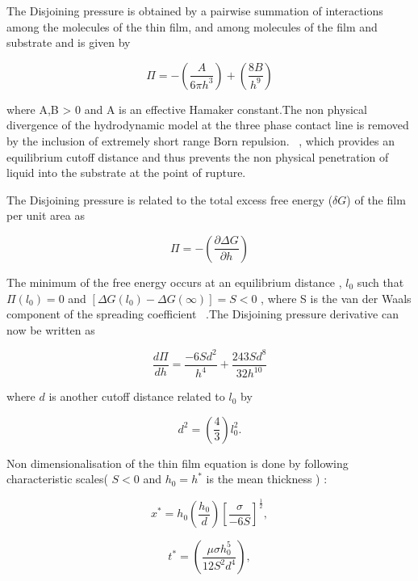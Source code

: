 \documentclass[
manuscript=article]{achemso}
\begin{document}
The Disjoining pressure is obtained by a pairwise summation of interactions among the molecules of the thin film, and among molecules of the  film and substrate and is given by

\begin{equation}
\Pi = - \left(\frac{A}{6 \pi h^{3}} \right) + \left( \frac{8B}{h^{9}} \right)
\end{equation}

where A,B > 0 and A is an effective Hamaker constant.The non physical divergence of the hydrodynamic model at the three phase contact line is removed by the inclusion of extremely short range Born repulsion.~\cite{10} , which provides an equilibrium cutoff distance and thus prevents the non physical penetration of liquid into the substrate at the point of rupture.

The Disjoining pressure is related to the total excess free energy ($ \delta G  $) of the film per unit area as

\begin{equation}
\Pi = -\left(\frac{\partial{\Delta G}}{\partial{h}} \right)
\end{equation}

The minimum of the free energy occurs at an equilibrium distance , $ l_{0} $ such that $ \Pi(l_{0}) = 0 $
and $ \left[\Delta G\left(l_{0}\right) - \Delta G\left(\infty\right) \right] = S < 0 $ , where S is the van der Waals component of the spreading coefficient ~\cite{11}.The Disjoining pressure derivative can now be written as ~\cite{12}

\begin{equation}
\frac{d\Pi}{dh} = \frac{-6Sd^{2}}{h^{4}} + \frac{243Sd^{8}}{32h^{10}}
\end{equation}  

where $d$ is another cutoff distance related to $ l_{0} $ by 

\begin{equation}
d^{2} = \left( \frac{4}{3}\right) l_{0}^{2}.
\end{equation}
 
Non dimensionalisation of the thin film equation is done by following characteristic scales( $  S < 0 $  and $  h_{0} = h^{*} $ is the mean thickness  ) :

\begin{equation}
x^{*} = h_{0}\left(\frac{h_{0}}{d}\right)\left[\frac{\sigma}{-6S}\right]^\frac{1}{2} ,
\end{equation}

\begin{equation}
t^{*} = \left(\frac{\mu \sigma h_{0}^{5}}{12S^{2}d^4}\right) ,
\end{equation} 
\end{document}
